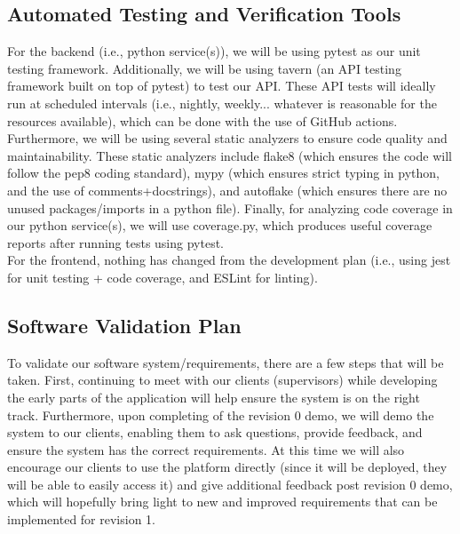 \documentclass[12pt, titlepage]{article}
\begin{document}


\subsection{Automated Testing and Verification Tools}

For the backend (i.e., python service(s)), we will be using pytest as our unit testing framework. Additionally,
we will be using tavern (an API testing framework built on top of pytest) to test our API. These API tests will
ideally run at scheduled intervals (i.e., nightly, weekly... whatever is reasonable for the resources available), which can be 
done with the use of GitHub actions. Furthermore, we will be using several static analyzers to ensure code quality and maintainability. These 
static analyzers include flake8 (which ensures the code will follow the pep8 coding standard), mypy (which ensures strict typing in python,
and the use of comments+docstrings), and autoflake (which ensures there are no unused packages/imports in a python file). Finally, for analyzing 
code coverage in our python service(s), we will use coverage.py, which produces useful coverage reports after running tests using pytest.\\

For the frontend, nothing has changed from the development plan (i.e., using jest for unit testing + code coverage, and ESLint for linting).

\subsection{Software Validation Plan}

To validate our software system/requirements, there are a few steps that will be taken. First, continuing to meet with our clients (supervisors) while developing
the early parts of the application will help ensure the system is on the right track. Furthermore, upon completing of the revision 0 demo, we will
demo the system to our clients, enabling them to ask questions, provide feedback, and ensure the system has the correct requirements. At this
time we will also encourage our clients to use the platform directly (since it will be deployed, they will be able to easily access it) and give additional feedback post revision 0 demo,
which will hopefully bring light to new and improved requirements that can be implemented for revision 1. 
\end{document}
